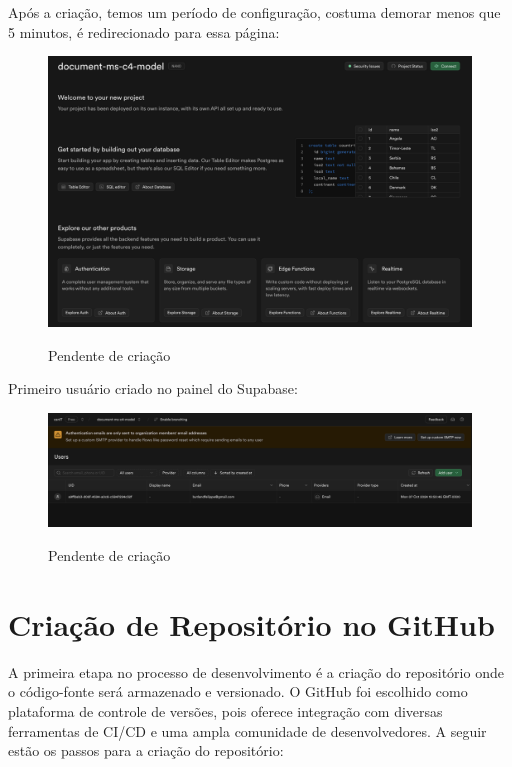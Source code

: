 Após a criação, temos um período de configuração, costuma demorar menos que 5
minutos, é redirecionado para essa página:

\begin{figure}[!ht]
    \centering
    \caption{Pendente de criação}
    \includegraphics[scale=0.44]{assets/pending-creation}
    \label{fig:pending-creation}
    \tiny
    \sourcemedaddy
\end{figure}

Primeiro usuário criado no painel do Supabase:

\begin{figure}[!ht]
    \centering
    \caption{Pendente de criação}
    \includegraphics[scale=0.44]{assets/first-user}
    \label{fig:first-user}
    \tiny
    \sourcemedaddy
\end{figure}

\section{Criação de Repositório no GitHub}

A primeira etapa no processo de desenvolvimento é a criação do repositório onde o código-fonte será armazenado e versionado. O GitHub foi escolhido como plataforma de controle de versões, pois oferece integração com diversas ferramentas de CI/CD e uma ampla comunidade de desenvolvedores. A seguir estão os passos para a criação do repositório:

